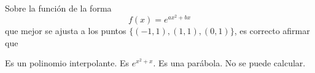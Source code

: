 \begin{pregunta}
\begin{cuerpo}
Sobre la función de la forma
$$
f(x)=e^{ax^2+bx}
$$
que mejor se ajusta a los puntos 
$\{(-1,1),(1,1),(0,1)\}$, es correcto afirmar que
\end{cuerpo}
\begin{alternativas}
{Es un polinomio interpolante.} %
{Es $e^{x^2+x}$.}
{Es una parábola.}
{No se puede calcular.}
\end{alternativas}
\justificacion{7cm}
\end{pregunta}
